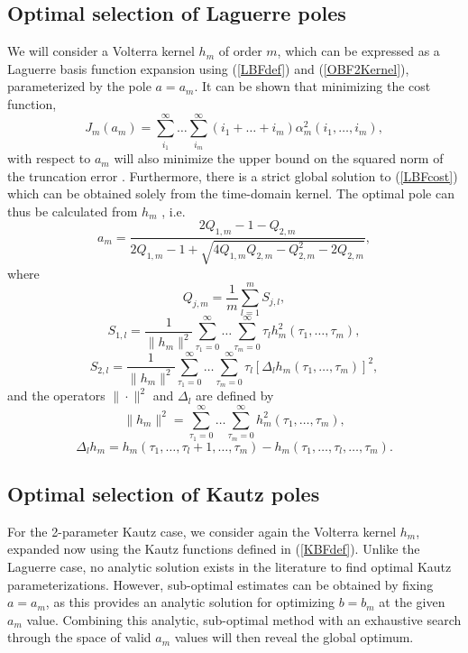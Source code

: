 \subsection{Optimal selection of Laguerre poles}
\label{sec:OptimalLBFpole}

We will consider a Volterra kernel $h_m$ of order $m$, which can be expressed as a Laguerre basis function expansion using (\ref{LBFdef}) and (\ref{OBF2Kernel}), parameterized by the pole $a  = a_m$.  It can be shown that minimizing the cost function, 
\begin{equation}
\label{LBFcost}
J_m(a_m) = \sum_{i_1}^{\infty} \hdots \sum_{i_m}^{\infty} (i_1 + \hdots + i_m) \alpha_m^2(i_1, \hdots , i_m),
\end{equation}
with respect to $a_m$ will also minimize the upper bound on the squared norm of the truncation error \cite{Campello2004}. Furthermore, there is a strict global solution to (\ref{LBFcost}) which can be obtained solely from the time-domain kernel.  The optimal pole can thus be calculated from $h_m$ \cite{Campello2004}, i.e.
\begin{equation}
a_m = \frac{2Q_{1,m}-1-Q_{2,m}}{2Q_{1,m}-1+\sqrt{4Q_{1,m}Q_{2,m}-Q_{2,m}^2-2Q_{2,m}}},
\end{equation}
where 
$$Q_{j,m}= \frac{1}{m} \sum_{l=1}^{m} S_{j,l},$$
$$S_{1,l} = \frac{1}{\| h_m \|^2} \sum_{\tau_1=0}^{\infty} \hdots \sum_{\tau_m=0}^{\infty} \tau_l h_m^2(\tau_1, \hdots, \tau_m),$$
$$S_{2,l} = \frac{1}{\| h_m \|^2} \sum_{\tau_1=0}^{\infty} \hdots \sum_{\tau_m=0}^{\infty} \tau_l [\Delta_l h_m(\tau_1, \hdots, \tau_m)]^2,$$
and the operators $\| \cdot \|^2$ and $\Delta_l$ are defined by
$$ \| h_m \|^2 = \sum_{\tau_1=0}^{\infty} \hdots \sum_{\tau_m=0}^{\infty} h_m^2(\tau_1, \hdots, \tau_m),$$
$$ \Delta_l  h_m = h_m(\tau_1, \hdots, \tau_l + 1, \hdots, \tau_m) - h_m(\tau_1, \hdots, \tau_l, \hdots, \tau_m).$$ 

\subsection{Optimal selection of Kautz poles}
\label{sec:OptimalKBFpoles}

For the 2-parameter Kautz case, we consider again the Volterra kernel $h_m$, expanded now using the Kautz functions defined in (\ref{KBFdef}). Unlike the Laguerre case, no analytic solution exists in the literature to find optimal Kautz parameterizations. However, sub-optimal estimates can be obtained by fixing $a = a_m$, as this provides an analytic solution \cite{Rosa2007} for optimizing $b = b_m$ at the given $a_m$ value. Combining this analytic, sub-optimal method with an exhaustive search through the space of valid $a_m$ values will then reveal the global optimum.

